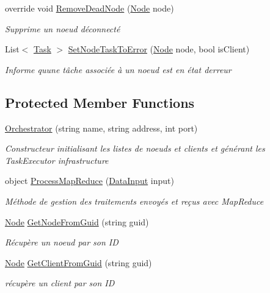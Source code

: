 \begin{DoxyCompactItemize}
override void \hyperlink{class_node_net_1_1_network_1_1_orch_1_1_orchestrator_ae5ded9dbc1d4a515dfc69ac65391b51e}{Remove\+Dead\+Node} (\hyperlink{class_node_net_1_1_network_1_1_nodes_1_1_node}{Node} node)
\begin{DoxyCompactList}\small\item\em Supprime un noeud déconnecté \end{DoxyCompactList}\item 
List$<$ \hyperlink{class_node_net_1_1_tasks_1_1_task}{Task} $>$ \hyperlink{class_node_net_1_1_network_1_1_orch_1_1_orchestrator_a70b4a3a4ba06b1b7225d0063fcaedec7}{Set\+Node\+Task\+To\+Error} (\hyperlink{class_node_net_1_1_network_1_1_nodes_1_1_node}{Node} node, bool is\+Client)
\begin{DoxyCompactList}\small\item\em Informe qu\textquotesingle{}une tâche associée à un noeud est en état d\textquotesingle{}erreur \end{DoxyCompactList}\end{DoxyCompactItemize}
\subsection*{Protected Member Functions}
\begin{DoxyCompactItemize}
\item 
\hyperlink{class_node_net_1_1_network_1_1_orch_1_1_orchestrator_ac31c8b0eade85fc84dc2f84ea2fc480b}{Orchestrator} (string name, string address, int port)
\begin{DoxyCompactList}\small\item\em Constructeur initialisant les listes de noeuds et clients et générant les Task\+Executor infrastructure \end{DoxyCompactList}\item 
object \hyperlink{class_node_net_1_1_network_1_1_orch_1_1_orchestrator_ab0bdae10fc319c1ab9bc2fa5b89474d2}{Process\+Map\+Reduce} (\hyperlink{class_node_net_1_1_data_1_1_data_input}{Data\+Input} input)
\begin{DoxyCompactList}\small\item\em Méthode de gestion des traitements envoyés et reçus avec Map\+Reduce \end{DoxyCompactList}\item 
\hyperlink{class_node_net_1_1_network_1_1_nodes_1_1_node}{Node} \hyperlink{class_node_net_1_1_network_1_1_orch_1_1_orchestrator_a890e7f185cf857d9baa9a99fe1430906}{Get\+Node\+From\+Guid} (string guid)
\begin{DoxyCompactList}\small\item\em Récupère un noeud par son ID \end{DoxyCompactList}\item 
\hyperlink{class_node_net_1_1_network_1_1_nodes_1_1_node}{Node} \hyperlink{class_node_net_1_1_network_1_1_orch_1_1_orchestrator_a314e4b697c54cc24437acc668f35c059}{Get\+Client\+From\+Guid} (string guid)
\begin{DoxyCompactList}\small\item\em récupère un client par son ID \end{DoxyCompactList}\end{DoxyCompactItemize}
